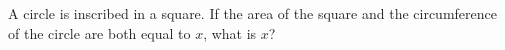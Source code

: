 A circle is inscribed in a square. If the area of the square and the circumference of the circle are both equal to $x$, what is $x$?
